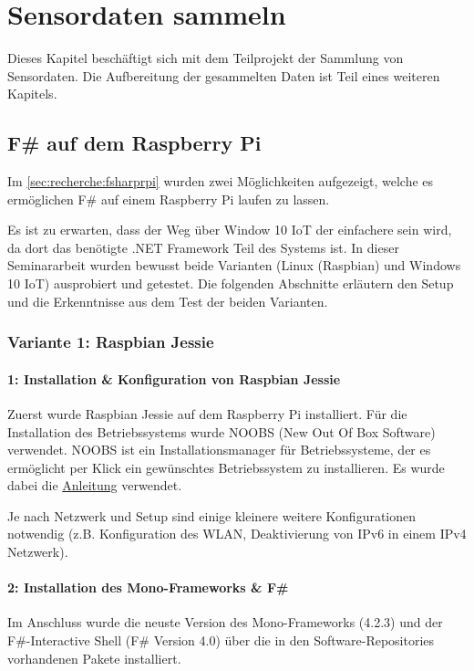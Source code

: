
\chapter{Sensordaten sammeln}
Dieses Kapitel beschäftigt sich mit dem Teilprojekt der Sammlung von Sensordaten. Die Aufbereitung der gesammelten Daten ist Teil eines weiteren Kapitels.


\section{F\# auf dem Raspberry Pi}
Im \cref{sec:recherche:fsharprpi}  wurden zwei Möglichkeiten aufgezeigt, welche es ermöglichen F\# auf einem Raspberry Pi laufen zu lassen.

Es ist zu erwarten, dass der Weg über Window 10 IoT der einfachere sein wird, da dort das benötigte .NET Framework Teil des Systems ist. In dieser Seminararbeit wurden bewusst beide Varianten (Linux (Raspbian) und Windows 10 IoT) ausprobiert und getestet. Die folgenden Abschnitte erläutern den Setup und die Erkenntnisse aus dem Test der beiden Varianten. 

\subsection{Variante 1: Raspbian Jessie}
\subsubsection{1: Installation \& Konfiguration von Raspbian Jessie}
Zuerst wurde Raspbian Jessie auf dem Raspberry Pi installiert. Für die Installation des Betriebssystems wurde NOOBS (New Out Of Box Software) verwendet. NOOBS ist ein Installationsmanager für Betriebssysteme, der es ermöglicht per Klick ein gewünschtes Betriebssystem zu installieren. Es wurde dabei die \hyperlink{https://www.raspberrypi.org/documentation/installation/noobs.md}{Anleitung} verwendet.

Je nach Netzwerk und Setup sind einige kleinere weitere Konfigurationen notwendig (z.B. Konfiguration des WLAN, Deaktivierung von IPv6 in einem IPv4 Netzwerk).


\subsubsection{2: Installation des Mono-Frameworks \& F\#}
Im Anschluss wurde die neuste Version des Mono-Frameworks (4.2.3) und der F\#-Interactive Shell (F\# Version 4.0) über die in den Software-Repositories vorhandenen Pakete installiert.

